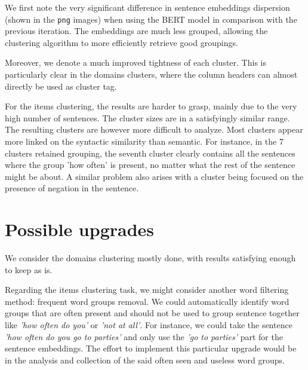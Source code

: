 \documentclass{article}
\begin{document}
We first note the very significant difference in sentence embeddings dispersion (shown in the
\texttt{png} images) when using the BERT model in comparison with the previous iteration. The
embeddings are much less grouped, allowing the clustering algorithm to more efficiently retrieve
good groupings.

Moreover, we denote a much improved tightness of each cluster. This is particularly clear in
the domains clusters, where the column headers can almost directly be used as cluster tag.

For the items clustering, the results are harder to grasp, mainly due to the very high number
of sentences. The cluster sizes are in a satisfyingly similar range. The resulting
clusters are however more difficult to analyze. Most clusters appear more linked on the
syntactic similarity than semantic. For instance, in the 7 clusters retained grouping, the
seventh cluster clearly contains all the sentences where the group 'how often' is present,
no matter what the rest of the sentence might be about. A similar problem also arises
with a cluster being focused on the presence of negation in the sentence.

\section*{Possible upgrades}

We consider the domains clustering mostly done, with results satisfying enough to keep as is.

Regarding the items clustering task, we might consider another word filtering method: frequent
word groups removal. We could automatically identify word groups that are often present and
should not be used to group sentence together like \textit{'how often do you'} or \textit{'not at all'}. For instance,
we could take the sentence \textit{'how often do you go to parties'} and only use the
\textit{'go to parties'} part for the sentence embeddings. The effort to implement this
particular upgrade would be in the analysis and collection of the said often seen and useless
word groups.
\end{document}
